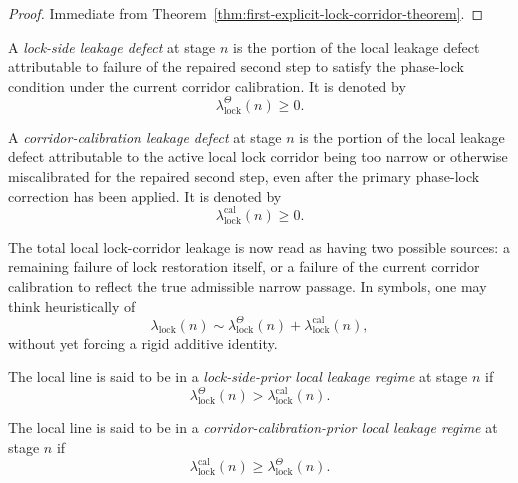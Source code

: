\begin{proof}
Immediate from Theorem~\ref{thm:first-explicit-lock-corridor-theorem}.
\end{proof}



\begin{definition}
\label{def:lock-side-leakage-defect}
A \emph{lock-side leakage defect} at stage $n$ is the portion of the local leakage defect attributable to failure of the repaired second step to satisfy the phase-lock condition under the current corridor calibration. It is denoted by
\[
  \lambda_{\mathrm{lock}}^{\Theta}(n)\ge 0.
\]
\end{definition}

\begin{definition}
\label{def:corridor-calibration-leakage-defect}
A \emph{corridor-calibration leakage defect} at stage $n$ is the portion of the local leakage defect attributable to the active local lock corridor being too narrow or otherwise miscalibrated for the repaired second step, even after the primary phase-lock correction has been applied. It is denoted by
\[
  \lambda_{\mathrm{lock}}^{\mathrm{cal}}(n)\ge 0.
\]
\end{definition}

\begin{remark}
\label{rem:how-the-leakage-splits}
The total local lock-corridor leakage is now read as having two possible sources: a remaining failure of lock restoration itself, or a failure of the current corridor calibration to reflect the true admissible narrow passage. In symbols, one may think heuristically of
\[
  \lambda_{\mathrm{lock}}(n)
  \sim
  \lambda_{\mathrm{lock}}^{\Theta}(n)
  +
  \lambda_{\mathrm{lock}}^{\mathrm{cal}}(n),
\]
without yet forcing a rigid additive identity.
\end{remark}

\begin{definition}
\label{def:lock-side-prior-local-leakage-regime}
The local line is said to be in a \emph{lock-side-prior local leakage regime} at stage $n$ if
\[
  \lambda_{\mathrm{lock}}^{\Theta}(n)
  >
  \lambda_{\mathrm{lock}}^{\mathrm{cal}}(n).
\]
\end{definition}

\begin{definition}
\label{def:corridor-calibration-prior-local-leakage-regime}
The local line is said to be in a \emph{corridor-calibration-prior local leakage regime} at stage $n$ if
\[
  \lambda_{\mathrm{lock}}^{\mathrm{cal}}(n)
  \ge
  \lambda_{\mathrm{lock}}^{\Theta}(n).
\]
\end{definition}

